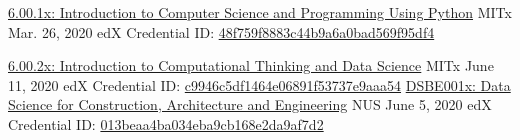 
\begin{cventries}

\cventry
    {\href{https://courses.edx.org/certificates/48f759f8883c44b9a6a0bad569f95df4}{6.00.1x: Introduction to Computer Science and Programming Using Python}} %
    {MITx} %
    {Mar. 26, 2020} %
    {edX} %
    {
      Credential ID: \href{https://courses.edx.org/certificates/48f759f8883c44b9a6a0bad569f95df4}{48f759f8883c44b9a6a0bad569f95df4}
    }
    
    \cventry
    {\href{https://courses.edx.org/certificates/c9946c5df1464e06891f53737e9aaa54}{6.00.2x: Introduction to Computational Thinking and Data Science}} %
    {MITx} %
    {June 11, 2020} %
    {edX} %
    {
      Credential ID: \href{https://courses.edx.org/certificates/c9946c5df1464e06891f53737e9aaa54}{c9946c5df1464e06891f53737e9aaa54}
    }
\cventry
        {\href{https://courses.edx.org/certificates/013beaa4ba034eba9cb168e2da9af7d2}{DSBE001x: Data Science for Construction, Architecture and Engineering}} %
    {NUS} %
    {June 5, 2020} %
    {edX} %
    {
      Credential ID: \href{https://courses.edx.org/certificates/013beaa4ba034eba9cb168e2da9af7d2}{013beaa4ba034eba9cb168e2da9af7d2}
    }


\end{cventries}